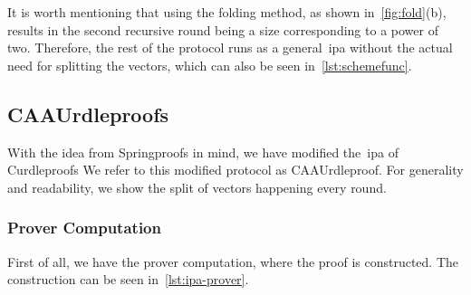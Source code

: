 It is worth mentioning that using the folding method, as shown in~\autoref{fig:fold}(b), results in the second recursive round being a size corresponding to a power of two.
Therefore, the rest of the protocol runs as a general~\gls{ipa} without the actual need for splitting the vectors, which can also be seen in~\autoref{lst:schemefunc}.

\subsection{CAAUrdleproofs}\label{subsec:approach-CAAUrdleproofs}
With the idea from Springproofs in mind, we have modified the~\gls{ipa} of Curdleproofs
We refer to this modified protocol as CAAUrdleproof.
For generality and readability, we show the split of vectors happening every round.

\subsubsection*{Prover Computation}
First of all, we have the prover computation, where the proof is constructed.
The construction can be seen in~\autoref{lst:ipa-prover}.

